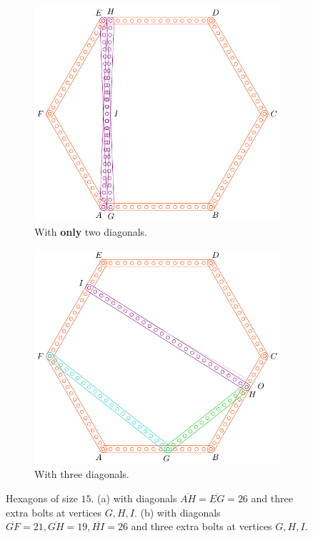 \documentclass[11pt]{article}
\begin{document}
\begin{figure}[H]
\centering
\begin{subfigure}{0.49\textwidth}
 \centering
 \includegraphics[scale=0.8]{15/hexa-15a}
 \caption{With \textbf{only} two diagonals. }
\end{subfigure}
\begin{subfigure}{0.49\textwidth}
 \centering
 \includegraphics[scale=0.8]{15/hexa-15b}
 \caption{With three diagonals. }
\end{subfigure}
\caption{Hexagons of size $15$. (a) with diagonals $\overline{AH} = \overline{EG} = 26$ and three extra bolts at vertices $G,H,I$. (b) with diagonals $\overline{GF} = 21, \overline{GH} = 19, \overline{HI} = 26$ and three extra bolts at vertices $G,H,I$.}
\label{fig:15ab}
\end{figure}
\end{document}
